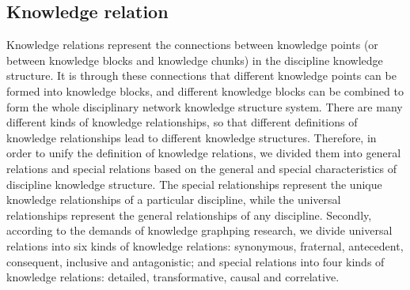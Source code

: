 \subsection{Knowledge relation}
Knowledge relations represent the connections between knowledge points (or between knowledge blocks and knowledge chunks) in the discipline knowledge structure. It is through these connections that different knowledge points can be formed into knowledge blocks, and different knowledge blocks can be combined to form the whole disciplinary network knowledge structure system. There are many different kinds of knowledge relationships, so that different definitions of knowledge relationships lead to different knowledge structures. Therefore, in order to unify the definition of knowledge relations, we divided them into general relations and special relations based on the general and special characteristics of discipline knowledge structure. The special relationships represent the unique knowledge relationships of a particular discipline, while the universal relationships represent the general relationships of any discipline. Secondly, according to the demands of knowledge graphping research, we divide universal relations into six kinds of knowledge relations: synonymous, fraternal, antecedent, consequent, inclusive and antagonistic; and special relations into four kinds of knowledge relations: detailed, transformative, causal and correlative.
